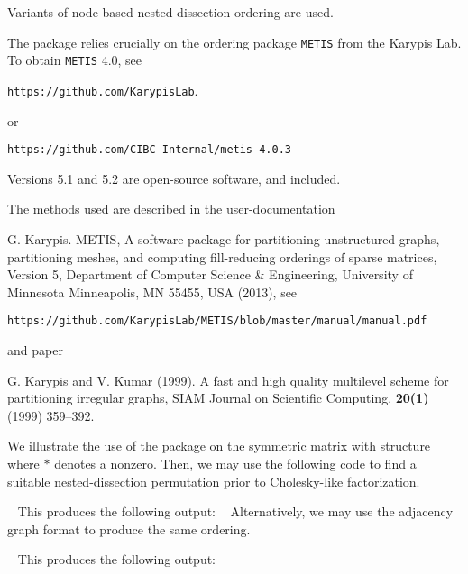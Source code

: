 \documentclass{galahad}
\begin{document}

\galmethod
Variants of node-based nested-dissection ordering are used.

\noindent
The package relies crucially on the ordering package {\tt METIS} from 
the Karypis Lab. To obtain {\tt METIS} 4.0, see

  {\tt https://github.com/KarypisLab}.

\noindent
or 

  {\tt https://github.com/CIBC-Internal/metis-4.0.3}

\noindent
Versions 5.1 and 5.2 are open-source software, and included.

\vspace*{1mm}

\galreferences
\vspace*{1mm}

\noindent
The methods used are described in the user-documentation
\vspace*{1mm}

\noindent
G. Karypis.
METIS, A software package for partitioning unstructured
graphs, partitioning meshes, and computing
fill-reducing orderings of sparse matrices, Version 5,
Department of Computer Science \& Engineering, University of Minnesota
Minneapolis, MN 55455, USA (2013), see

   {\tt https://github.com/KarypisLab/METIS/blob/master/manual/manual.pdf}

\noindent
and paper

\noindent
G. Karypis and V. Kumar (1999). 
A fast and high quality multilevel scheme for partitioning irregular graphs,
SIAM Journal on Scientific Computing. {\bf 20(1)} (1999) 359--392.


\galexample
We illustrate the use of the package on the symmetric matrix with structure
where $\ast$ denotes a nonzero.
Then, we may use the following code to find a suitable nested-dissection 
permutation prior to Cholesky-like factorization.

{\tt \small
\VerbatimInput{\packageexample}
}
\noindent
This produces the following output:
{\tt \small
\VerbatimInput{\packageresults}
}
\noindent
Alternatively, we may use the adjacency graph format to produce the same
ordering.

{\tt \small
\VerbatimInput{\packageexampleb}
}
\noindent
This produces the following output:
{\tt \small
\VerbatimInput{\packageresultsb}
}
\noindent
\end{document}
